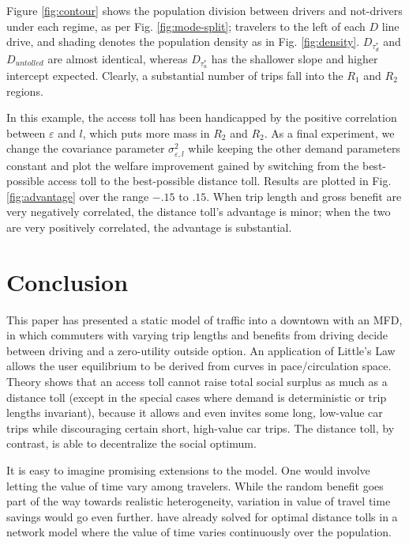 \documentclass[preprint,authoryear]{elsarticle}
\newcommand{\taud}{\tau_d}
\newcommand{\taua}{\tau_a}
\newcommand{\ve}{\varepsilon}
\begin{document}
Figure \ref{fig:contour} shows the population division between drivers and not-drivers under each regime, as per Fig. \ref{fig:mode-split}; travelers to the left of each $D$ line drive, and shading denotes the population density as in Fig. \ref{fig:density}. $D_{\taud^*}$ and $D_{untolled}$ are almost identical, whereas $D_{\taua^*}$ has the shallower slope and higher intercept expected. Clearly, a substantial number of trips fall into the $R_1$ and $R_2$ regions.

In this example, the access toll has been handicapped by the positive correlation between $\ve$ and $l$, which puts more mass in $R_2$ and $R_2$. As a final experiment, we change the covariance parameter $\sigma_{\ve,l}^2$ while keeping the other demand parameters constant and plot the welfare improvement gained by switching from the best-possible access toll to the best-possible distance toll. Results are plotted in Fig. \ref{fig:advantage} over the range $-.15$ to $.15$. When trip length and gross benefit are very negatively correlated, the distance toll's advantage is minor; when the two are very positively correlated, the advantage is substantial.

\section{Conclusion}
\label{sec:conclusion}

This paper has presented a static model of traffic into a downtown with an MFD, in which commuters with varying trip lengths and benefits from driving decide between driving and a zero-utility outside option. An application of Little's Law allows the user equilibrium to be derived from curves in pace/circulation space. Theory shows that an access toll cannot raise total social surplus as much as a distance toll (except in the special cases where demand is deterministic or trip lengths invariant), because it allows and even invites some long, low-value car trips while discouraging certain short, high-value car trips. The distance toll, by contrast, is able to decentralize the social optimum.

It is easy to imagine promising extensions to the model. One would involve letting the value of time vary among travelers. While the random benefit goes part of the way towards realistic heterogeneity, variation in value of travel time savings would go even further. \citet{Meng2012} have already solved for optimal distance tolls in a network model where the value of time varies continuously over the population.
\end{document}
